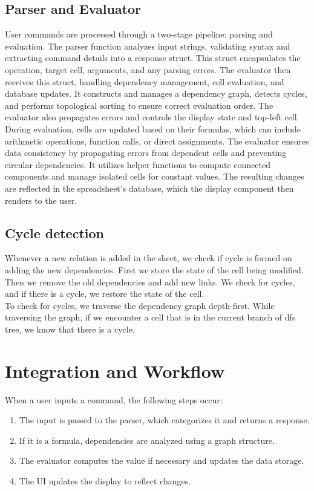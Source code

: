 \documentclass{article}
\begin{document}
\subsection{Parser and Evaluator}
User commands are processed through a two-stage pipeline: parsing and evaluation. The parser function analyzes input strings, validating syntax and extracting command details into a response struct. This struct encapsulates the operation, target cell, arguments, and any parsing errors. The evaluator then receives this struct, handling dependency management, cell evaluation, and database updates. It constructs and manages a dependency graph, detects cycles, and performs topological sorting to ensure correct evaluation order. The evaluator also propagates errors and controls the display state and top-left cell.\\
During evaluation, cells are updated based on their formulas, which can include arithmetic operations, function calls, or direct assignments. The evaluator ensures data consistency by propagating errors from dependent cells and preventing circular dependencies. It utilizes helper functions to compute connected components and manage isolated cells for constant values. The resulting changes are reflected in the spreadsheet's database, which the display component then renders to the user.

\subsection{Cycle detection}
Whenever a new relation is added in the sheet, we check if cycle is formed on adding the new dependencies. First we store the state of the cell being modified. Then we remove the old dependencies and add new links. We check for cycles, and if there is a cycle, we restore the state of the cell.\\
To check for cycles, we traverse the dependency graph depth-first. While traversing the graph, if we encounter a cell that is in the current branch of dfs tree, we know that there is a cycle.


\section{Integration and Workflow}
When a user inputs a command, the following steps occur:
\begin{enumerate}
    \item The input is passed to the parser, which categorizes it and returns a response.
    \item If it is a formula, dependencies are analyzed using a graph structure.
    \item The evaluator computes the value if necessary and updates the data storage.
    \item The UI updates the display to reflect changes.
\end{enumerate}
\end{document}

